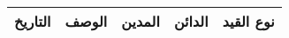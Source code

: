 ﻿\documentclass[12pt]{article}
\begin{document}
\begin{landscape}
\begin{longtable}{p{2cm}|p{6cm}|p{3cm}|p{3cm}|p{4cm}}
\hline
\textbf{التاريخ} & \textbf{الوصف} & \textbf{المدين} & \textbf{الدائن} & \textbf{نوع القيد} \\ \hline
\endhead
\end{longtable}
\end{landscape}
\end{document}
